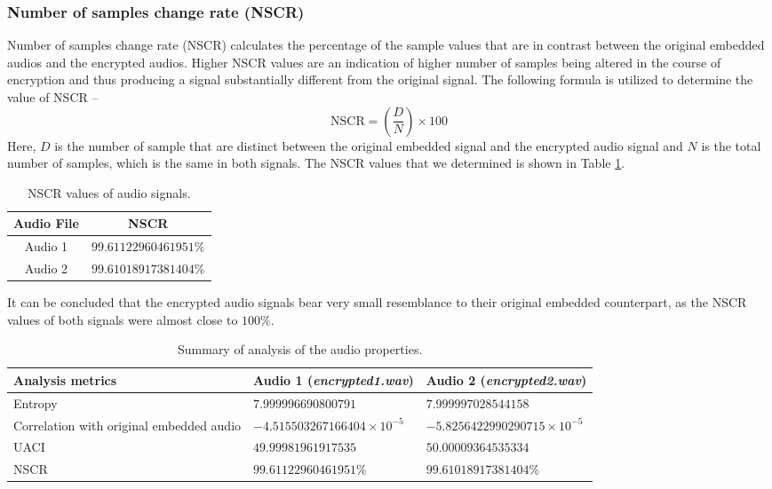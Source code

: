 \documentclass{article}
\begin{document}
\subsubsection{Number of samples change rate (NSCR)}
Number of samples change rate (NSCR) calculates the percentage of the sample values that are in contrast between the original embedded audios and the encrypted audios. Higher NSCR values are an indication of higher number of samples being altered in the course of encryption and thus producing a signal substantially different from the original signal. The following formula is utilized to determine the value of NSCR --
\[\text{NSCR}=\left(\frac{D}{N}\right)\times100\]
Here, $D$ is the number of sample that are distinct between the original embedded signal and the encrypted audio signal and $N$ is the total number of samples, which is the same in both signals. The NSCR values that we determined is shown in Table \ref{table:nscr}.
\begin{table}[!h]
    \begin{center}
        \caption{NSCR values of audio signals.}
        \begin{tabular}{cc}
            \hline
            Audio File & NSCR                  \\ \hline
            Audio 1    & $99.61122960461951\%$ \\ \hdashline
            Audio 2    & $99.61018917381404\%$ \\ \hline
        \end{tabular}
        \label{table:nscr}
    \end{center}
\end{table}

It can be concluded that the encrypted audio signals bear very small resemblance to their original embedded counterpart, as the NSCR values of both signals were almost close to $100\%$.

\begin{table}[!h]
    \begin{center}
        \caption{Summary of analysis of the audio properties.}
        \begin{tabularx}{\textwidth}{>{\centering\arraybackslash}X>{\centering\arraybackslash}X>{\centering\arraybackslash}X}
            \hline
            Analysis metrics                         & Audio 1 (\textit{encrypted1.wav}) & Audio 2 (\textit{encrypted2.wav})  \\ \hline
            Entropy                                  & $7.999996690800791$               & $7.999997028544158$                \\
            Correlation with original embedded audio & $-4.515503267166404\times10^{-5}$ & $-5.8256422990290715\times10^{-5}$ \\
            UACI                                     & $49.99981961917535$               & $50.00009364535334$                \\
            NSCR                                     & $99.61122960461951\%$             & $99.61018917381404\%$              \\ \hline
        \end{tabularx}
        \label{table:analysis}
    \end{center}
\end{table}
\end{document}
